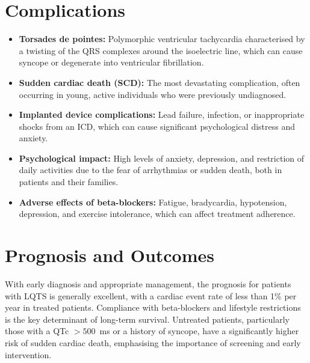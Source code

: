 \section*{Complications}
\begin{itemize}
    \item \textbf{Torsades de pointes:} Polymorphic ventricular tachycardia characterised by a twisting of the QRS complexes around the isoelectric line, which can cause syncope or degenerate into ventricular fibrillation.
    \item \textbf{Sudden cardiac death (SCD):} The most devastating complication, often occurring in young, active individuals who were previously undiagnosed.
    \item \textbf{Implanted device complications:} Lead failure, infection, or inappropriate shocks from an ICD, which can cause significant psychological distress and anxiety.
    \item \textbf{Psychological impact:} High levels of anxiety, depression, and restriction of daily activities due to the fear of arrhythmias or sudden death, both in patients and their families.
    \item \textbf{Adverse effects of beta-blockers:} Fatigue, bradycardia, hypotension, depression, and exercise intolerance, which can affect treatment adherence.
\end{itemize}

\section*{Prognosis and Outcomes}
With early diagnosis and appropriate management, the prognosis for patients with LQTS is generally excellent, with a cardiac event rate of less than 1\% per year in treated patients. Compliance with beta-blockers and lifestyle restrictions is the key determinant of long-term survival. Untreated patients, particularly those with a QTc $>500$~ms or a history of syncope, have a significantly higher risk of sudden cardiac death, emphasising the importance of screening and early intervention.

